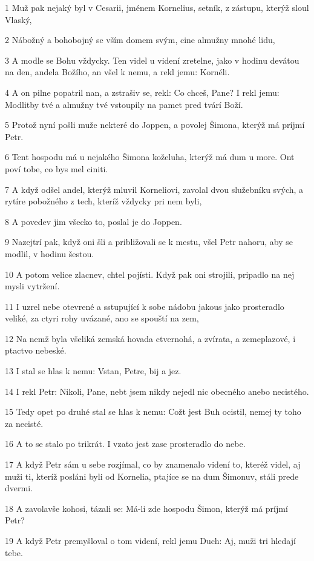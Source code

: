 \par 1 Muž pak nejaký byl v Cesarii, jménem Kornelius, setník, z zástupu, kterýž sloul Vlaský,
\par 2 Nábožný a bohobojný se vším domem svým, cine almužny mnohé lidu,
\par 3 A modle se Bohu vždycky. Ten videl u videní zretelne, jako v hodinu devátou na den, andela Božího, an všel k nemu, a rekl jemu: Kornéli.
\par 4 A on pilne popatril nan, a zstrašiv se, rekl: Co chceš, Pane? I rekl jemu: Modlitby tvé a almužny tvé vstoupily na pamet pred tvárí Boží.
\par 5 Protož nyní pošli muže nekteré do Joppen, a povolej Šimona, kterýž má príjmí Petr.
\par 6 Tent hospodu má u nejakého Šimona koželuha, kterýž má dum u more. Ont poví tobe, co bys mel ciniti.
\par 7 A když odšel andel, kterýž mluvil Korneliovi, zavolal dvou služebníku svých, a rytíre pobožného z tech, kteríž vždycky pri nem byli,
\par 8 A povedev jim všecko to, poslal je do Joppen.
\par 9 Nazejtrí pak, když oni šli a približovali se k mestu, všel Petr nahoru, aby se modlil, v hodinu šestou.
\par 10 A potom velice zlacnev, chtel pojísti. Když pak oni strojili, pripadlo na nej mysli vytržení.
\par 11 I uzrel nebe otevrené a sstupující k sobe nádobu jakous jako prosteradlo veliké, za ctyri rohy uvázané, ano se spouští na zem,
\par 12 Na nemž byla všeliká zemská hovada ctvernohá, a zvírata, a zemeplazové, i ptactvo nebeské.
\par 13 I stal se hlas k nemu: Vstan, Petre, bij a jez.
\par 14 I rekl Petr: Nikoli, Pane, nebt jsem nikdy nejedl nic obecného anebo necistého.
\par 15 Tedy opet po druhé stal se hlas k nemu: Cožt jest Buh ocistil, nemej ty toho za necisté.
\par 16 A to se stalo po trikrát. I vzato jest zase prosteradlo do nebe.
\par 17 A když Petr sám u sebe rozjímal, co by znamenalo videní to, kteréž videl, aj muži ti, kteríž posláni byli od Kornelia, ptajíce se na dum Šimonuv, stáli prede dvermi.
\par 18 A zavolavše kohosi, tázali se: Má-li zde hospodu Šimon, kterýž má príjmí Petr?
\par 19 A když Petr premyšloval o tom videní, rekl jemu Duch: Aj, muži tri hledají tebe.
